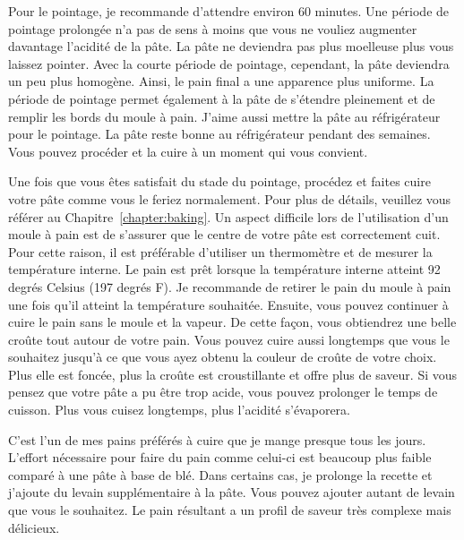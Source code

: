 Pour le pointage, je recommande d'attendre environ 60 minutes. Une période de pointage prolongée n'a pas de sens à moins que vous ne vouliez augmenter davantage l'acidité de la pâte. La pâte ne deviendra pas plus moelleuse
plus vous laissez pointer. Avec la courte période de pointage, cependant,
la pâte deviendra un peu plus homogène. Ainsi, le pain final a une apparence plus uniforme. La période de pointage permet également à la
pâte de s'étendre pleinement et de remplir les bords du moule à pain. J'aime aussi
mettre la pâte au réfrigérateur pour le pointage. La pâte reste
bonne au réfrigérateur pendant des semaines. Vous pouvez procéder et la cuire à un
moment qui vous convient. 

Une fois que vous êtes satisfait du stade du pointage, procédez et faites cuire votre pâte
comme vous le feriez normalement. Pour plus de détails, veuillez vous référer au 
Chapitre~\ref{chapter:baking}. Un aspect difficile
lors de l'utilisation d'un moule à pain est de s'assurer que le centre de votre pâte est correctement cuit. Pour cette raison, il est préférable d'utiliser un thermomètre
et de mesurer la température interne. Le pain est
prêt lorsque la température interne atteint  92 degrés Celsius (197 degrés F). Je recommande
de retirer le pain du moule à pain une fois qu'il atteint la température souhaitée. Ensuite, vous pouvez continuer à cuire le pain sans le moule et
la vapeur. De cette façon, vous obtiendrez une belle croûte tout autour de votre
pain. Vous pouvez cuire aussi longtemps que vous le souhaitez jusqu'à ce que vous ayez obtenu
la couleur de croûte de votre choix. Plus elle est foncée, plus la croûte est croustillante
et offre plus de saveur. Si vous pensez que votre
pâte a pu être trop acide, vous pouvez prolonger le temps de cuisson.
Plus vous cuisez longtemps, plus l'acidité s'évaporera.

C'est l'un de mes pains préférés à cuire que je mange presque tous les
jours. L'effort nécessaire pour faire du pain comme
celui-ci est beaucoup plus faible comparé à une pâte à base de blé. Dans certains
cas, je prolonge la recette et j'ajoute du levain supplémentaire
à la pâte. Vous pouvez ajouter autant de levain que vous le souhaitez. Le pain résultant
a un profil de saveur très complexe mais délicieux.